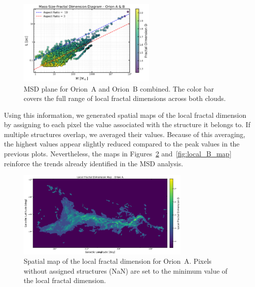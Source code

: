 \begin{figure}[t]
    \centering
    \includegraphics[width=0.6\textwidth]{figures/MSD_Orion_A_B.png}
    \caption{MSD plane for Orion~A and Orion~B combined. The color bar covers the full range of local fractal dimensions across both clouds.}
    \label{fig:MSD_orion_A_B}
\end{figure}

Using this information, we generated spatial maps of the local fractal dimension by assigning to each pixel the value associated with the structure it belongs to.  
If multiple structures overlap, we averaged their values.  
Because of this averaging, the highest values appear slightly reduced compared to the peak values in the previous plots.  
Nevertheless, the maps in Figures~\ref{fig:local_A_map} and~\ref{fig:local_B_map} reinforce the trends already identified in the MSD analysis.

\begin{figure}[t]
    \centering
    \includegraphics[width=0.75\textwidth]{figures/local_fractal_dimension_map_Orion_A.png}
    \caption{Spatial map of the local fractal dimension for Orion~A. Pixels without assigned structures (NaN) are set to the minimum value of the local fractal dimension.}
    \label{fig:local_A_map}
\end{figure}

